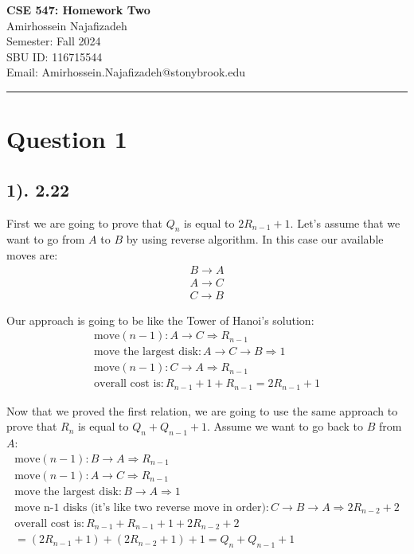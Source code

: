 \documentclass[12pt]{article}
\begin{document}
\begin{center}
    {\LARGE\textbf{CSE 547: Homework Two}} \\[1em]
    {\large Amirhossein Najafizadeh} \\[1em]
    Semester: Fall 2024 \\ 
    SBU ID: 116715544 \\
    Email: Amirhossein.Najafizadeh@stonybrook.edu \\[1em]
    \noindent\rule{\textwidth}{0.6pt}
\end{center}

\section*{Question 1}
\subsection*{1). 2.22}
First we are going to prove that $Q_{n}$ is equal to $2R_{n-1}+1$. Let's assume that we want to go from $A$ to $B$ by using reverse algorithm. In this case our available moves are:
\begin{gather*}
    B \to A \\
    A \to C \\
    C \to B
\end{gather*}

Our approach is going to be like the Tower of Hanoi's solution:
\begin{gather*}
    \text{move} (n-1) : A \to C \Rightarrow R_{n-1} \\
    \text{move the largest disk} : A \to C \to B \Rightarrow 1 \\
    \text{move} (n-1) : C \to A \Rightarrow R_{n-1} \\
    \text{overall cost is} : R_{n-1} + 1 + R_{n-1} = 2R_{n-1} + 1
\end{gather*}

Now that we proved the first relation, we are going to use the same approach to prove that $R_{n}$ is equal to $Q_{n}+Q_{n-1}+1$. Assume we want to go back to $B$ from $A$:
\begin{gather*}
    \text{move} (n-1) : B \to A \Rightarrow R_{n-1} \\
    \text{move} (n-1) : A \to C \Rightarrow R_{n-1} \\
    \text{move the largest disk} : B \to A \Rightarrow 1 \\
    \text{move n-1 disks (it's like two reverse move in order)} : C \to B \to A \Rightarrow 2R_{n-2}+2 \\
    \text{overall cost is} : R_{n-1} + R_{n-1} + 1 + 2R_{n-2} + 2 \\= (2R_{n-1} + 1) + (2R_{n-2} + 1) + 1 = Q_{n} + Q_{n-1} + 1
\end{gather*}
\end{document}
